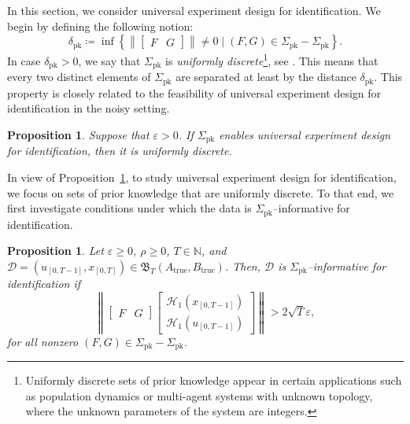 \documentclass[journal,twoside,web]{ieeecolor}
\newcommand{\set}[2]{\left\{#1 \mid #2\right\}}
\newcommand{\norm}[1]{\left\|#1\right\|}
\newtheorem{proposition}[theorem]{Proposition}
\begin{document}
In this section, we consider universal experiment design for identification. We begin by defining the following notion:
\begin{equation}
\delta_\text{pk}\coloneqq\inf\set{\norm{\begin{bmatrix}
F & G
\end{bmatrix}}\neq0}{(F,G)\in\Sigma_\text{pk}-\Sigma_\text{pk}}.
\end{equation}
In case $\delta_\text{pk}>0$, we say that $\Sigma_\text{pk}$ is \emph{uniformly discrete}\footnote{Uniformly discrete sets of prior knowledge appear in certain applications such as population dynamics or multi-agent systems with unknown topology, where the unknown parameters of the system are integers.}, see \cite[p. 36]{beer1993topologies}. This means that every two distinct elements of $\Sigma_\text{pk}$ are separated at least by the distance $\delta_\text{pk}$. This property is closely related to the feasibility of universal experiment design for identification in the noisy setting. 

\begin{proposition}
\label{prop:impossible_noisy}
Suppose that $\varepsilon>0$. If $\Sigma_\text{pk}$ enables universal experiment design for identification, then it is uniformly discrete. 
\end{proposition}

In view of Proposition~\ref{prop:impossible_noisy}, to study universal experiment design for identification, we focus on sets of prior knowledge that are uniformly discrete. To that end, we first investigate conditions under which the data is $\Sigma_\text{pk}$--informative for identification. 

\begin{proposition}
\label{prop:data_best_noisy}
Let $\varepsilon\geq 0$, $\rho\geq 0$, $T\in\mathbb{N}$, and $\mathcal{D}=(u_{[0,T-1]},x_{[0,T]})\in\mathfrak{B}_T(A_\text{true},B_\text{true})$. Then, $\mathcal{D}$ is \mbox{$\Sigma_\text{pk}$--informative} for identification if
\begin{equation}
\label{eq:rank_data_generalized_noisy}
\norm{\begin{bmatrix}
F & G
\end{bmatrix}\begin{bmatrix}
\mathcal{H}_1(x_{[0,T-1]}) \\
\mathcal{H}_1(u_{[0,T-1]})
\end{bmatrix}}> 2\sqrt{T}\varepsilon,
\end{equation}
for all nonzero $(F,G)\in\Sigma_\text{pk}-\Sigma_\text{pk}$.
\end{proposition}
\end{document}
